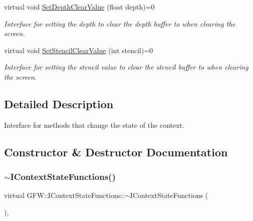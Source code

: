 \begin{DoxyCompactItemize}
virtual void \hyperlink{class_g_f_w_1_1_i_context_state_functions_a9adfbb8db43de0e7479c57884a00902b}{Set\+Depth\+Clear\+Value} (float depth)=0
\begin{DoxyCompactList}\small\item\em Interface for setting the depth to clear the depth buffer to when clearing the screen. \end{DoxyCompactList}\item 
virtual void \hyperlink{class_g_f_w_1_1_i_context_state_functions_a3d504c4c6cb646780cf433932272faef}{Set\+Stencil\+Clear\+Value} (int stencil)=0
\begin{DoxyCompactList}\small\item\em Interface for setting the stencil value to clear the stencil buffer to when clearing the screen. \end{DoxyCompactList}\end{DoxyCompactItemize}


\subsection{Detailed Description}
Interface for methods that change the state of the context. 

\subsection{Constructor \& Destructor Documentation}
\mbox{\label{class_g_f_w_1_1_i_context_state_functions_aa724020f7b666ca6639372161c1c3bb7}} 
\subsubsection{\texorpdfstring{$\sim$\+I\+Context\+State\+Functions()}{~IContextStateFunctions()}}
{\footnotesize\ttfamily virtual G\+F\+W\+::\+I\+Context\+State\+Functions\+::$\sim$\+I\+Context\+State\+Functions (\begin{DoxyParamCaption}{ }\end{DoxyParamCaption})\hspace{0.3cm}{\ttfamily [virtual]}, {\ttfamily [default]}}



